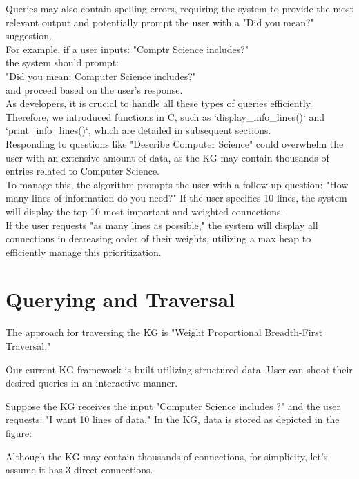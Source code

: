 \documentclass[conference]{IEEEtran}
\begin{document}
Queries may also contain spelling errors, requiring the system to provide the most relevant output and potentially prompt the user with a "Did you mean?" suggestion.
\\
For example, if a user inputs: "Comptr Science includes?" 
\\the system should prompt:
\\
"Did you mean: Computer Science includes?" 
\\
and proceed based on the user's response.
\\

As developers, it is crucial to handle all these types of queries efficiently. Therefore, we introduced functions in C, such as `display\_info\_lines()` and `print\_info\_lines()`, which are detailed in subsequent sections.
\\

Responding to questions like "Describe Computer Science" could overwhelm the user with an extensive amount of data, as the KG may contain thousands of entries related to Computer Science. \\
To manage this, the algorithm prompts the user with a follow-up question: "How many lines of information do you need?" If the user specifies 10 lines, the system will display the top 10 most important and weighted connections. 
\\
If the user requests "as many lines as possible," the system will display all connections in decreasing order of their weights, utilizing a max heap to efficiently manage this prioritization.





\section{Querying and Traversal}


The approach for traversing the KG is "Weight Proportional Breadth-First 
Traversal."

Our current KG framework is built utilizing structured data. 
User can shoot their desired queries in an interactive manner. 

Suppose the KG receives the input "Computer Science includes ?" and the user requests: "I want 10 lines of data."
In the KG, data is stored as depicted in the figure:





Although the KG may contain thousands of connections, for simplicity, let's assume it has 3 direct connections.
\end{document}
